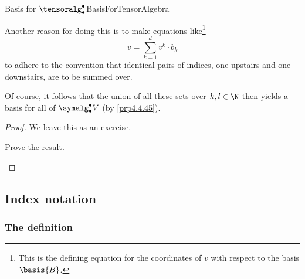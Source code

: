 \begin{prp}{Basis for $\tensoralg _{\bullet}^{\bullet}$}{BasisForTensorAlgebra}
\begin{rmk}
		Another reason for doing this is to make equations like\footnote{This is the defining equation for the coordinates of $v$ with respect to the basis $\basis{B}$.}
		\begin{equation}
			v=\sum _{k=1}^dv^k\cdot b_k
		\end{equation}
		to adhere to the convention that identical pairs of indices, one upstairs and one downstairs, are to be summed over.
	\end{rmk}
	\begin{rmk}
		Of course, it follows that the union of all these sets over $k,l\in \N$ then yields a basis for all of $\symalg _{\bullet}^{\bullet}V$ (by \cref{prp4.4.45}).
	\end{rmk}
	\begin{proof}
		We leave this as an exercise.
		\begin{exr}[breakable=false]{}{}
			Prove the result.
		\end{exr}
	\end{proof}
\end{prp}

\subsection{Index notation}

\subsubsection{The definition}

